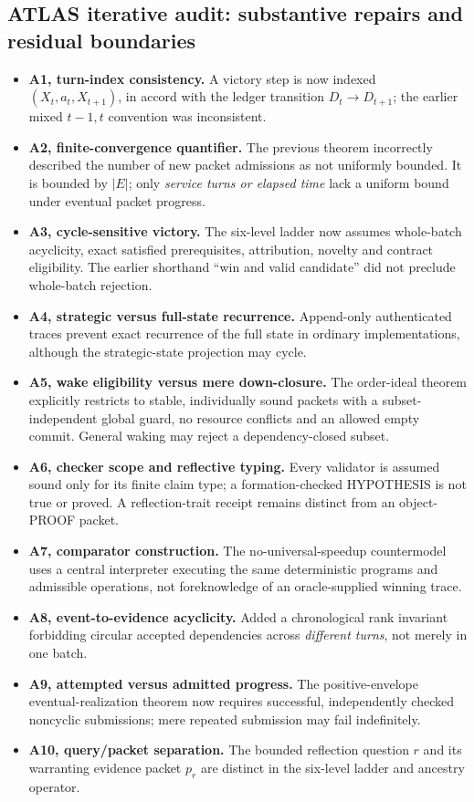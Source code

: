 \documentclass[11pt,letterpaper]{article}
\begin{document}
\subsection{ATLAS iterative audit: substantive repairs and residual boundaries}
\begin{itemize}
\item \textbf{A1, turn-index consistency.} A victory step is now indexed $(X_t,a_t,X_{t+1})$, in accord with the ledger transition $D_t\to D_{t+1}$; the earlier mixed $t-1,t$ convention was inconsistent.
\item \textbf{A2, finite-convergence quantifier.} The previous theorem incorrectly described the number of new packet admissions as not uniformly bounded. It is bounded by $|E|$; only \emph{service turns or elapsed time} lack a uniform bound under eventual packet progress.
\item \textbf{A3, cycle-sensitive victory.} The six-level ladder now assumes whole-batch acyclicity, exact satisfied prerequisites, attribution, novelty and contract eligibility. The earlier shorthand ``win and valid candidate'' did not preclude whole-batch rejection.
\item \textbf{A4, strategic versus full-state recurrence.} Append-only authenticated traces prevent exact recurrence of the full state in ordinary implementations, although the strategic-state projection may cycle.
\item \textbf{A5, wake eligibility versus mere down-closure.} The order-ideal theorem explicitly restricts to stable, individually sound packets with a subset-independent global guard, no resource conflicts and an allowed empty commit. General waking may reject a dependency-closed subset.
\item \textbf{A6, checker scope and reflective typing.} Every validator is assumed sound only for its finite claim type; a formation-checked HYPOTHESIS is not true or proved. A reflection-trait receipt remains distinct from an object-PROOF packet.
\item \textbf{A7, comparator construction.} The no-universal-speedup countermodel uses a central interpreter executing the same deterministic programs and admissible operations, not foreknowledge of an oracle-supplied winning trace.
\item \textbf{A8, event-to-evidence acyclicity.} Added a chronological rank invariant forbidding circular accepted dependencies across \emph{different turns}, not merely in one batch.
\item \textbf{A9, attempted versus admitted progress.} The positive-envelope eventual-realization theorem now requires successful, independently checked noncyclic submissions; mere repeated submission may fail indefinitely.
\item \textbf{A10, query/packet separation.} The bounded reflection question $r$ and its warranting evidence packet $p_r$ are distinct in the six-level ladder and ancestry operator.
\end{itemize}
\end{document}
